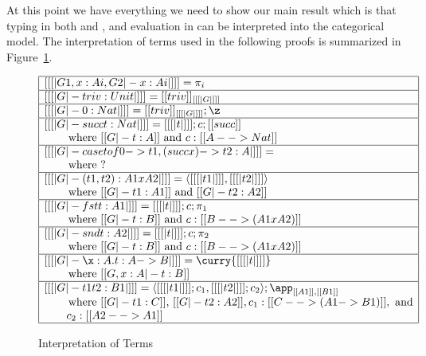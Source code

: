 At this point we have everything we need to show our main result which
is that typing in both  and , and evaluation in
 can be interpreted into the categorical model.  The
interpretation of terms used in the following proofs is summarized in
Figure~\ref{fig:interp-terms}.
\begin{figure}
  \small  
    \begin{center}
      \begin{math}
          \begin{array}{|l|}
            \hline
            [[ [| G1 , x : Ai , G2 |- x : Ai |] ]] = \pi_i\\
            \hline
            [[ [| G |- triv : Unit |] ]] = [[triv]]_{[[ [| G |] ]]}\\
            \hline
            [[ [| G |- 0 : Nat |] ]] = [[triv]]_{[[ [| G |] ]]};\z\\
            \hline
            [[ [| G |- succ t : Nat |] ]] = [[ [| t |] ]];c;[[succ]]\\
            \,\,\,\,\,\,\,\,\,\,\,\text{ where } [[G |- t : A]]\text{ and }c : [[A --> Nat]]\\
            \hline
            [[ [| G |- case t of 0 -> t1, (succ x) -> t2 : A |] ]] = \\
            \,\,\,\,\,\,\,\,\,\,\,\text{ where } ?\\
            \hline
            [[ [| G |- (t1,t2) : A1 x A2 |] ]] = \langle [[ [| t1 |] ]] , [[ [| t2 |] ]] \rangle\\
            \,\,\,\,\,\,\,\,\,\,\,\text{ where } [[G |- t1 : A1]]\text{ and } [[G |- t2 : A2]]\\
            \hline
            [[ [| G |- fst t : A1 |] ]] = [[ [| t |] ]];c;\pi_1\\
            \,\,\,\,\,\,\,\,\,\,\,\text{ where } [[G |- t : B]]\text{ and }c : [[B --> (A1 x A2)]]\\
            \hline
            [[ [| G |- snd t : A2 |] ]] = [[ [| t |] ]];c;\pi_2\\           
            \,\,\,\,\,\,\,\,\,\,\,\text{ where } [[G |- t : B]]\text{ and }c : [[B --> (A1 x A2)]]\\
            \hline
            [[ [| G |- \x:A.t : A -> B |] ]] = \curry{[[ [| t |] ]]}\\
            \,\,\,\,\,\,\,\,\,\,\,\text{ where } [[G, x : A |- t : B]]\\
            \hline
            [[ [| G |- t1 t2 : B1 |] ]] = \langle [[ [| t1 |] ]];c_1, [[ [| t2 |] ]];c_2\rangle;\app_{[[A1]],[[B1]]}\\
            \,\,\,\,\,\,\,\,\,\,\,\text{ where } [[G |- t1 : C]]\text{, }[[G |- t2 : A2]], c_1 : [[C --> (A1 -> B1)]],\text{ and}\\
            \,\,\,\,\,\,\,\,\,\,\,\,c_2 : [[A2 --> A1]]\\                        
            \hline
          \end{array}
      \end{math}
    \end{center}
  \caption{Interpretation of Terms}
  \label{fig:interp-terms}
\end{figure}
